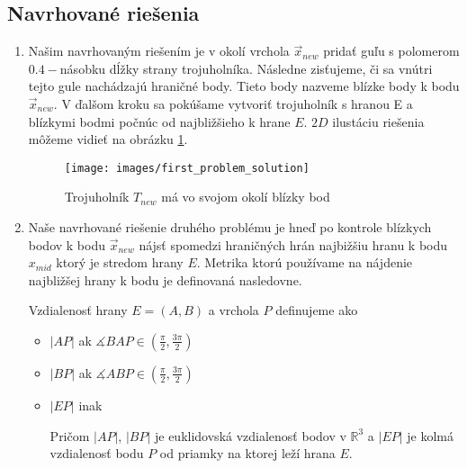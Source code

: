 \subsection{Navrhované riešenia}

\begin{enumerate}
\item{
    Našim navrhovaným riešením je v okolí vrchola $\overrightarrow{x}_{new}$ pridať guľu s polomerom 
    $0.4-$násobku dĺžky strany trojuholníka. Následne zisťujeme, či sa vnútri tejto gule nachádzajú 
    hraničné body. Tieto body nazveme blízke body k bodu $\overrightarrow{x}_{new}$. V ďalšom kroku 
    sa pokúšame vytvoriť trojuholník s hranou E a blízkymi bodmi počnúc od najbližšieho k hrane $E$. 
    $2D$ ilustáciu riešenia môžeme vidieť na obrázku \ref{obr:first_problem_solution}. 

    \begin{figure}
        \centerline{\texttt{[image: images/first\_problem\_solution]}}
        \caption[Trojuholník $T_{new}$ má vo svojom okolí blízky bod]{Trojuholník $T_{new}$ má vo svojom okolí blízky bod}
        \label{obr:first_problem_solution}
    \end{figure}
}

\item{

    Naše navrhované riešenie druhého problému je hneď po kontrole blízkych bodov k bodu 
    $\overrightarrow{x}_{new}$ nájsť spomedzi hraničných hrán najbižšiu hranu k bodu $x_{mid}$
    ktorý je stredom hrany $E$. 
    Metrika ktorú používame na nájdenie najbližšej hrany k bodu je definovaná nasledovne.

    \begin{definition} Vzdialenosť hrany $E=(A,B)$ a vrchola $P$ definujeme ako
    \label{def:segment_point_distance}
    \begin{itemize}
        \item{
            $|AP|$ ak $\measuredangle BAP \in (\frac{\pi}{2}, \frac{3\pi}{2})$
        }

        \item{
            $|BP|$ ak $\measuredangle ABP \in (\frac{\pi}{2}, \frac{3\pi}{2})$
        }

        \item{
            $|EP|$ inak
        }

        
        Pričom $|AP|$, $|BP|$ je euklidovská vzdialenosť bodov v $\mathbb{R}^3$ a $|EP|$ je kolmá 
        vzdialenosť bodu $P$ od priamky na ktorej leží hrana $E$.
    \end{itemize}


\end{definition}}
\end{enumerate}
